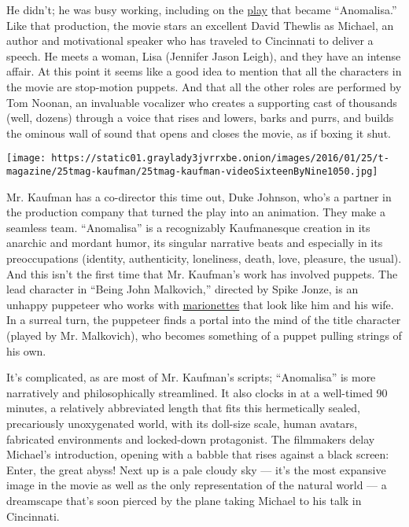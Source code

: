 He didn't; he was busy working, including on the
\href{http://articles.latimes.com/2005/sep/16/entertainment/et-ear16}{play}
that became ``Anomalisa.'' Like that production, the movie stars an
excellent David Thewlis as Michael, an author and motivational speaker
who has traveled to Cincinnati to deliver a speech. He meets a woman,
Lisa (Jennifer Jason Leigh), and they have an intense affair. At this
point it seems like a good idea to mention that all the characters in
the movie are stop-motion puppets. And that all the other roles are
performed by Tom Noonan, an invaluable vocalizer who creates a
supporting cast of thousands (well, dozens) through a voice that rises
and lowers, barks and purrs, and builds the ominous wall of sound that
opens and closes the movie, as if boxing it shut.

\texttt{[image: https://static01.graylady3jvrrxbe.onion/images/2016/01/25/t-magazine/25tmag-kaufman/25tmag-kaufman-videoSixteenByNine1050.jpg]}

Mr. Kaufman has a co-director this time out, Duke Johnson, who's a
partner in the production company that turned the play into an
animation. They make a seamless team. ``Anomalisa'' is a recognizably
Kaufmanesque creation in its anarchic and mordant humor, its singular
narrative beats and especially in its preoccupations (identity,
authenticity, loneliness, death, love, pleasure, the usual). And this
isn't the first time that Mr. Kaufman's work has involved puppets. The
lead character in ``Being John Malkovich,'' directed by Spike Jonze, is
an unhappy puppeteer who works with
\href{http://www.hubermarionettes.com/bjm/bjminterview.html}{marionettes}
that look like him and his wife. In a surreal turn, the puppeteer finds
a portal into the mind of the title character (played by Mr. Malkovich),
who becomes something of a puppet pulling strings of his own.

It's complicated, as are most of Mr. Kaufman's scripts; ``Anomalisa'' is
more narratively and philosophically streamlined. It also clocks in at a
well-timed 90 minutes, a relatively abbreviated length that fits this
hermetically sealed, precariously unoxygenated world, with its doll-size
scale, human avatars, fabricated environments and locked-down
protagonist. The filmmakers delay Michael's introduction, opening with a
babble that rises against a black screen: Enter, the great abyss! Next
up is a pale cloudy sky --- it's the most expansive image in the movie
as well as the only representation of the natural world --- a dreamscape
that's soon pierced by the plane taking Michael to his talk in
Cincinnati.

